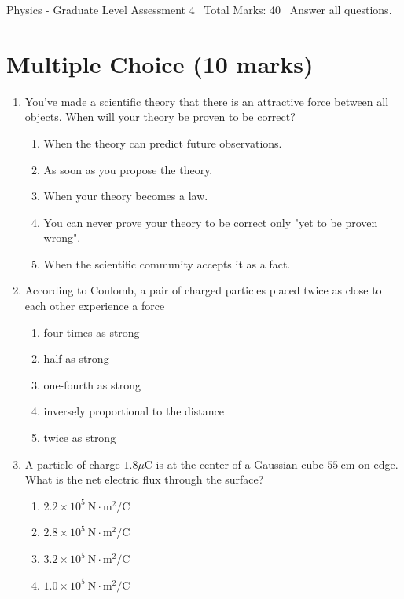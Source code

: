 \documentclass[12pt]{article}
\begin{document}
\begin{center}
Physics - Graduate Level Assessment 4 \
Total Marks: 40 \
Answer all questions.
\end{center}

\section*{Multiple Choice (10 marks)}
\begin{enumerate}[label=\arabic*.]
\item You've made a scientific theory that there is an attractive force between all objects.
When will your theory be proven to be correct?
\begin{enumerate}[label=(\alph*)]
    \item When the theory can predict future observations.
    \item As soon as you propose the theory.
    \item When your theory becomes a law.
    \item You can never prove your theory to be correct only "yet to be proven wrong".
    \item When the scientific community accepts it as a fact.
\end{enumerate}
\item According to Coulomb, a pair of charged particles placed twice as close to each other
experience a force
\begin{enumerate}[label=(\alph*)]
    \item four times as strong
    \item half as strong
    \item one-fourth as strong
    \item inversely proportional to the distance
    \item twice as strong
\end{enumerate}
\item A particle of charge $1.8 \mu \mathrm{C}$ is at the center of a Gaussian cube $55
\mathrm{~cm}$ on edge. What is the net electric flux through the surface?
\begin{enumerate}[label=(\alph*)]
    \item $2.2 \times 10^5 \mathrm{~N} \cdot \mathrm{m}^2 / \mathrm{C}$
    \item $2.8 \times 10^5 \mathrm{~N} \cdot \mathrm{m}^2 / \mathrm{C}$
    \item $3.2 \times 10^5 \mathrm{~N} \cdot \mathrm{m}^2 / \mathrm{C}$
    \item $1.0 \times 10^5 \mathrm{~N} \cdot \mathrm{m}^2 / \mathrm{C}$

\end{enumerate}
\end{enumerate}
\end{document}

